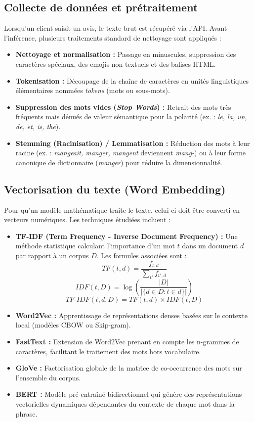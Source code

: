 \subsection{Collecte de données et prétraitement}
Lorsqu'un client saisit un avis, le texte brut est récupéré via l'API. Avant l'inférence, plusieurs traitements standard de nettoyage sont appliqués :
\begin{itemize}
    \item \textbf{Nettoyage et normalisation :} Passage en minuscules, suppression des caractères spéciaux, des emojis non textuels et des balises HTML.
    \item \textbf{Tokenisation :} Découpage de la chaîne de caractères en unités linguistiques élémentaires nommées \textit{tokens} (mots ou sous-mots).
    \item \textbf{Suppression des mots vides (\textit{Stop Words}) :} Retrait des mots très fréquents mais dénués de valeur sémantique pour la polarité (ex. : \textit{le, la, un, de, et, is, the}).
    \item \textbf{Stemming (Racinisation) / Lemmatisation :} Réduction des mots à leur racine (ex. : \textit{mangeait, manger, mangent} deviennent \textit{mang-}) ou à leur forme canonique de dictionnaire (\textit{manger}) pour réduire la dimensionnalité.
\end{itemize}

\subsection{Vectorisation du texte (Word Embedding)}
Pour qu'un modèle mathématique traite le texte, celui-ci doit être converti en vecteurs numériques. Les techniques étudiées incluent :
\begin{itemize}
    \item \textbf{TF-IDF (Term Frequency - Inverse Document Frequency) :} Une méthode statistique calculant l'importance d'un mot $t$ dans un document $d$ par rapport à un corpus $D$. Les formules associées sont :
    \[TF(t, d) = \frac{f_{t,d}}{\sum_{t'} f_{t',d}}\]
    \[IDF(t, D) = \log \left(\frac{|D|}{|\{d \in D : t \in d\}|}\right)\]
    \[TF\text{-}IDF(t, d, D) = TF(t, d) \times IDF(t, D)\]
    \item \textbf{Word2Vec :} Apprentissage de représentations denses basées sur le contexte local (modèles CBOW ou Skip-gram).
    \item \textbf{FastText :} Extension de Word2Vec prenant en compte les n-grammes de caractères, facilitant le traitement des mots hors vocabulaire.
    \item \textbf{GloVe :} Factorisation globale de la matrice de co-occurrence des mots sur l'ensemble du corpus.
    \item \textbf{BERT :} Modèle pré-entraîné bidirectionnel qui génère des représentations vectorielles dynamiques dépendantes du contexte de chaque mot dans la phrase.
\end{itemize}

